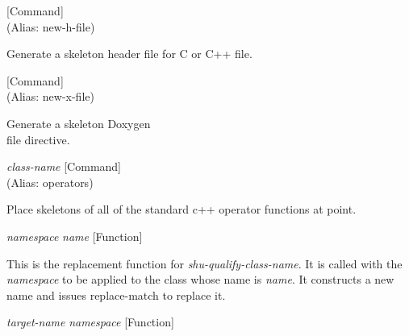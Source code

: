 \vspace{1em}
\noindent
{}
\usebox{\funcname}
 \hfill [Command]\\%
 (Alias: new-h-file)

\begin{doc-string}
Generate a skeleton header file for C or C++ file.
\end{doc-string}

\vspace{1em}
\noindent
{}
\usebox{\funcname}
 \hfill [Command]\\%
 (Alias: new-x-file)

\begin{doc-string}
Generate a skeleton Doxygen \\file directive.
\end{doc-string}

\vspace{1em}
\noindent
{}
\usebox{\funcname}\emph{class-name}
 \hfill [Command]\\%
 (Alias: operators)

\begin{doc-string}
Place skeletons of all of the standard c++ operator functions at point.
\end{doc-string}

\vspace{1em}
\noindent
{}
\usebox{\funcname}\emph{namespace} \emph{name}
 \hfill [Function]

\begin{doc-string}
This is the replacement function for \emph{shu-qualify-class-name}.  It is called
with the \emph{namespace} to be applied to the class whose name is \emph{name}.  It
constructs a new name and issues replace-match to replace it.
\end{doc-string}

\vspace{1em}
\noindent
{}
\usebox{\funcname}\emph{target-name} \emph{namespace}
 \hfill [Function]

